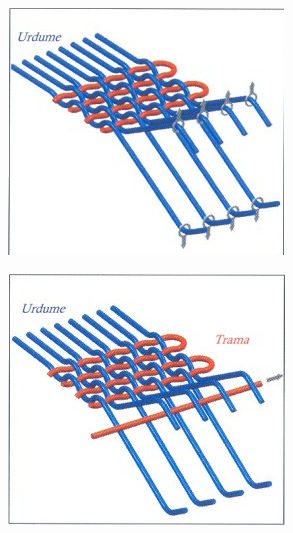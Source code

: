 \begin{multicols}{2}
\null
\columnbreak

\begin{center}
	\includegraphics[width=.9\linewidth]{./IMG/Tecer.jpg}
\end{center}

\null
\columnbreak

\begin{center}
	\includegraphics[width=.9\linewidth]{./IMG/Tecer2.jpg}
\end{center}

\end{multicols}
\vfill
\pagebreak


